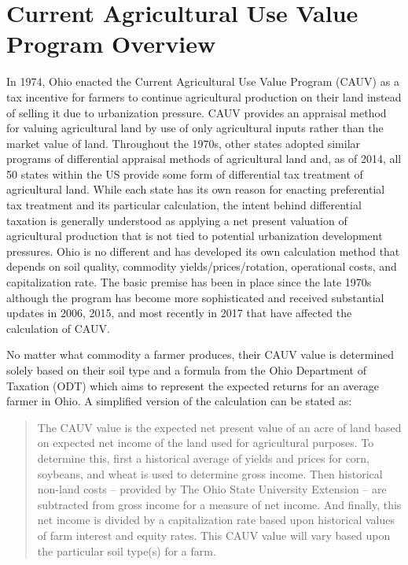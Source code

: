 \documentclass[]{article}
\begin{document}
\newpage

\hypertarget{current-agricultural-use-value-program-overview}{%
\section{Current Agricultural Use Value Program
Overview}\label{current-agricultural-use-value-program-overview}}

In 1974, Ohio enacted the Current Agricultural Use Value Program (CAUV)
as a tax incentive for farmers to continue agricultural production on
their land instead of selling it due to urbanization pressure. CAUV
provides an appraisal method for valuing agricultural land by use of
only agricultural inputs rather than the market value of land.
Throughout the 1970s, other states adopted similar programs of
differential appraisal methods of agricultural land and, as of 2014, all
50 states within the US provide some form of differential tax treatment
of agricultural land. While each state has its own reason for enacting
preferential tax treatment and its particular calculation, the intent
behind differential taxation is generally understood as applying a net
present valuation of agricultural production that is not tied to
potential urbanization development pressures. Ohio is no different and
has developed its own calculation method that depends on soil quality,
commodity yields/prices/rotation, operational costs, and capitalization
rate. The basic premise has been in place since the late 1970s although
the program has become more sophisticated and received substantial
updates in 2006, 2015, and most recently in 2017 that have affected the
calculation of CAUV.

No matter what commodity a farmer produces, their CAUV value is
determined solely based on their soil type and a formula from the Ohio
Department of Taxation (ODT) which aims to represent the expected
returns for an average farmer in Ohio. A simplified version of the
calculation can be stated as:

\begin{quote}
The CAUV value is the expected net present value of an acre of land
based on expected net income of the land used for agricultural purposes.
To determine this, first a historical average of yields and prices for
corn, soybeans, and wheat is used to determine gross income. Then
historical non-land costs -- provided by The Ohio State University
Extension -- are subtracted from gross income for a measure of net
income. And finally, this net income is divided by a capitalization rate
based upon historical values of farm interest and equity rates. This
CAUV value will vary based upon the particular soil type(s) for a farm.
\end{quote}
\end{document}
